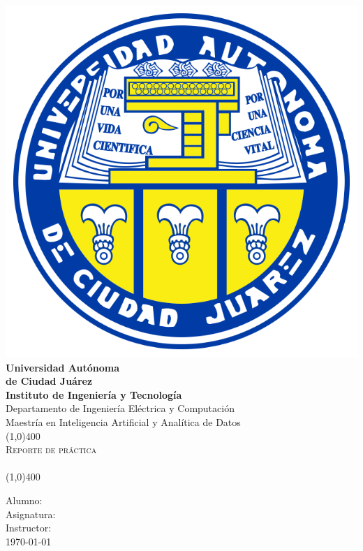 \documentclass[11pt]{article}
\newcommand{\myTitle}{Reporte de práctica \\ }
\newcommand{\myName}{Alumno: }
\newcommand{\myClass}{Asignatura: }
\newcommand{\myTecher}{Instructor: }
\newcommand{\myDate}{\today}  %
\begin{document}
\begin{titlepage}
	\begin{center}
		\includegraphics[scale=0.75]{UACJ.png}\\
		\huge{\textbf{Universidad Autónoma\\de Ciudad Juárez}} \\ 
		[0.25in] 
		
		\textbf{\Large{Instituto de Ingeniería y Tecnología}}\\
		\Large{Departamento de Ingeniería Eléctrica y Computación}\\
		\Large{Maestría en Inteligencia Artificial y Analítica de Datos}\\
		[1in]

		\line(1,0){400}\\
		[2mm]
		\textsc{\Large{\myTitle}} \\ 
		\line(1,0){400} \\ 
		[1in]
	\end{center}
	\begin{center}
		\myName \\ 
		\myClass\\ 
		\myTecher\\
		[0.5in]
		\myDate
	\end{center}
\end{titlepage}
\end{document}
